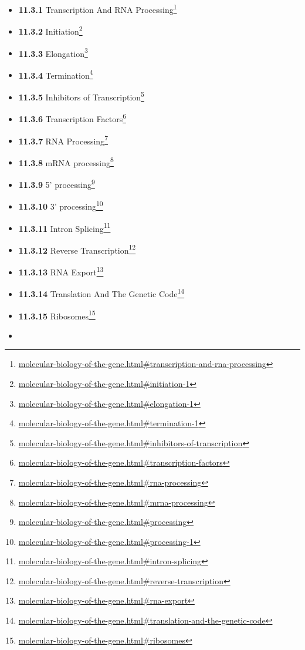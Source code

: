 \documentclass[
]{article}
\providecommand{\tightlist}{%
  \setlength{\itemsep}{0pt}\setlength{\parskip}{0pt}}
\providecommand{\tightlist}{%
  \setlength{\itemsep}{0pt}\setlength{\parskip}{0pt}}
\let\rmarkdownfootnote\footnote%
\def\footnote{\protect\rmarkdownfootnote}
\renewcommand{\href}[2]{#2\footnote{\url{#1}}}
\theoremstyle{definition}
\theoremstyle{definition}
\theoremstyle{definition}
\theoremstyle{remark}
\begin{document}
\begin{itemize}
\begin{itemize}
    \begin{itemize}
    \tightlist
    \item
      \href{molecular-biology-of-the-gene.html\#transcription-and-rna-processing}{\emph{}\textbf{11.3.1}
      Transcription And RNA Processing}
    \item
      \href{molecular-biology-of-the-gene.html\#initiation-1}{\emph{}\textbf{11.3.2}
      Initiation}
    \item
      \href{molecular-biology-of-the-gene.html\#elongation-1}{\emph{}\textbf{11.3.3}
      Elongation}
    \item
      \href{molecular-biology-of-the-gene.html\#termination-1}{\emph{}\textbf{11.3.4}
      Termination}
    \item
      \href{molecular-biology-of-the-gene.html\#inhibitors-of-transcription}{\emph{}\textbf{11.3.5}
      Inhibitors of Transcription}
    \item
      \href{molecular-biology-of-the-gene.html\#transcription-factors}{\emph{}\textbf{11.3.6}
      Transcription Factors}
    \item
      \href{molecular-biology-of-the-gene.html\#rna-processing}{\emph{}\textbf{11.3.7}
      RNA Processing}
    \item
      \href{molecular-biology-of-the-gene.html\#mrna-processing}{\emph{}\textbf{11.3.8}
      mRNA processing}
    \item
      \href{molecular-biology-of-the-gene.html\#processing}{\emph{}\textbf{11.3.9}
      5' processing}
    \item
      \href{molecular-biology-of-the-gene.html\#processing-1}{\emph{}\textbf{11.3.10}
      3' processing}
    \item
      \href{molecular-biology-of-the-gene.html\#intron-splicing}{\emph{}\textbf{11.3.11}
      Intron Splicing}
    \item
      \href{molecular-biology-of-the-gene.html\#reverse-transcription}{\emph{}\textbf{11.3.12}
      Reverse Transcription}
    \item
      \href{molecular-biology-of-the-gene.html\#rna-export}{\emph{}\textbf{11.3.13}
      RNA Export}
    \item
      \href{molecular-biology-of-the-gene.html\#translation-and-the-genetic-code}{\emph{}\textbf{11.3.14}
      Translation And The Genetic Code}
    \item
      \href{molecular-biology-of-the-gene.html\#ribosomes}{\emph{}\textbf{11.3.15}
      Ribosomes}
    \item

\end{itemize}
\end{itemize}
\end{itemize}
\end{document}
